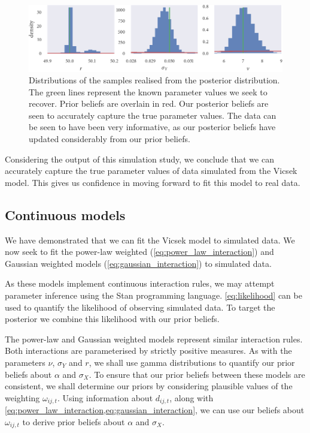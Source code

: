 \begin{figure}[tb]
    \includegraphics{mh_r_hist.pdf}
    \caption{Distributions of the samples realised from the posterior distribution. The
    green lines represent the known parameter values we seek to recover. Prior beliefs are
    overlain in red. Our posterior beliefs are seen to accurately capture the true
    parameter values. The data can be seen to have been very informative, as our posterior
    beliefs have updated considerably from our prior beliefs.}
    \label{fig:vicsek_sim_study_hists}
\end{figure}

Considering the output of this simulation study, we conclude that we can accurately
capture the true parameter values of data simulated from the Vicsek model. This gives us
confidence in moving forward to fit this model to real data.

\subsection{Continuous models}

We have demonstrated that we can fit the Vicsek model to simulated data.  We now seek to
fit the power-law weighted (\cref{eq:power_law_interaction}) and Gaussian weighted models
(\cref{eq:gaussian_interaction}) to simulated data.

As these models implement continuous interaction rules, we may attempt parameter inference
using the Stan programming language. \cref{eq:likelihood} can be used to quantify the likelihood of
observing simulated data. To target the posterior we combine this likelihood with our prior
beliefs.

The power-law and Gaussian weighted models represent similar interaction rules. Both
interactions are parameterised by strictly positive measures. As with the parameters
$\nu$, $\sigma_Y$ and $r$, we shall use gamma distributions to quantify our prior beliefs
about $\alpha$ and $\sigma_X$.  To ensure that our prior beliefs between these models are
consistent, we shall determine our priors by considering plausible values of the weighting
$\omega_{ij,t}$. Using information about $d_{ij,t}$, along with
\cref{eq:power_law_interaction,eq:gaussian_interaction}, we can use our beliefs about
$\omega_{ij,t}$ to derive prior beliefs about $\alpha$ and $\sigma_X$.


